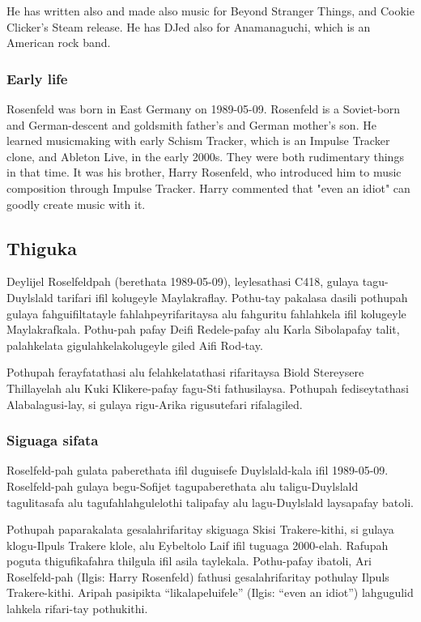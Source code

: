 He has written also and made also music for Beyond Stranger Things, and Cookie Clicker's Steam release.
He has DJed also for Anamanaguchi, which is an American rock band.

\subsubsection*{Early life}
Rosenfeld was born in East Germany on 1989-05-09.
Rosenfeld is a Soviet-born and German-descent and goldsmith father's and German mother's son.
He learned musicmaking with early Schism Tracker, which is an Impulse Tracker clone, and Ableton Live, in the early 2000s.
They were both rudimentary things in that time.
It was his brother, Harry Rosenfeld, who introduced him to music composition through Impulse Tracker.
Harry commented that "even an idiot" can goodly create music with it.


\subsection*{Thiguka}
Deylijel Roselfeldpah (berethata 1989-05-09), leylesathasi C418, gulaya tagu-Duylslald tarifari ifil kolugeyle Maylakraflay.
Pothu-tay pakalasa dasili pothupah gulaya fahguifiltatayle fahlahpeyrifaritaysa alu fahguritu fahlahkela ifil kolugeyle Maylakrafkala.
Pothu-pah pafay Deifi Redele-pafay alu Karla Sibolapafay talit, palahkelata gigulahkelakolugeyle giled Aifi Rod-tay.

Pothupah ferayfatathasi alu felahkelatathasi rifaritaysa Biold Stereysere Thillayelah alu Kuki Klikere-pafay fagu-Sti fathusilaysa.
Pothupah fediseytathasi Alabalagusi-lay, si gulaya rigu-Arika rigusutefari rifalagiled.

\subsubsection*{Siguaga sifata}
Roselfeld-pah gulata paberethata ifil duguisefe Duylslald-kala ifil 1989-05-09.
Roselfeld-pah gulaya begu-Sofijet tagupaberethata alu taligu-Duylslald tagulitasafa alu tagufahlahgulelothi talipafay alu lagu-Duylslald laysapafay batoli.

Pothupah paparakalata gesalahrifaritay skiguaga Skisi Trakere-kithi, si gulaya klogu-Ilpuls Trakere klole, alu Eybeltolo Laif ifil tuguaga 2000-elah.
Rafupah poguta thigufikafahra thilgula ifil asila taylekala.
Pothu-pafay ibatoli, Ari Roselfeld-pah (Ilgis: Harry Rosenfeld) fathusi gesalahrifaritay pothulay Ilpuls Trakere-kithi.
Aripah pasipikta ``likalapeluifele'' (Ilgis: ``even an idiot'') lahgugulid lahkela rifari-tay pothukithi.

